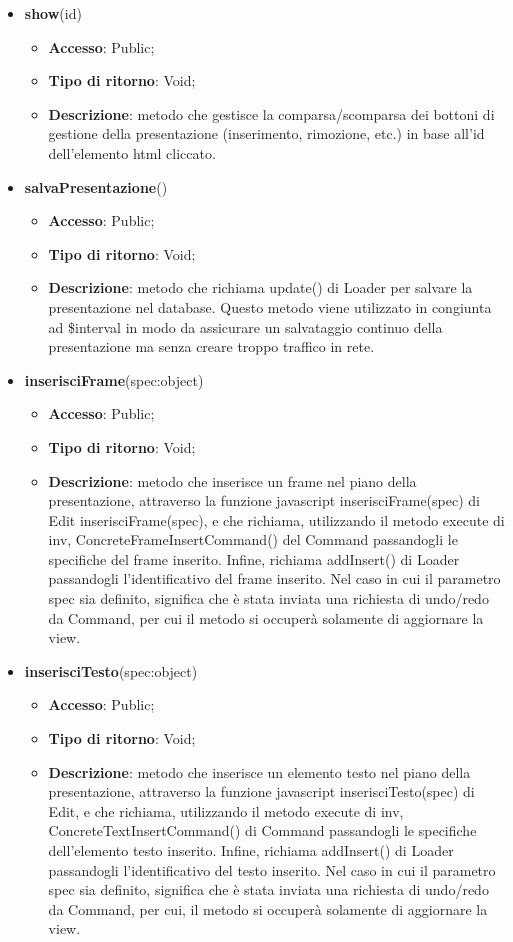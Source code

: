 {{\begin{itemize}
			\item \textbf{show}(id)
			\begin{itemize}
				\item \textbf{Accesso}: Public;
				\item \textbf{Tipo di ritorno}: Void;
				\item \textbf{Descrizione}: metodo che gestisce la comparsa/scomparsa dei bottoni di gestione della presentazione (inserimento, rimozione, etc.) in base all'id dell'elemento html cliccato.
			\end{itemize}
			\item \textbf{salvaPresentazione}()
			\begin{itemize}
				\item \textbf{Accesso}: Public;
				\item \textbf{Tipo di ritorno}: Void;
				\item \textbf{Descrizione}: metodo che richiama update() di Loader per salvare la presentazione nel database. Questo metodo viene utilizzato in congiunta ad \$interval in modo da assicurare un salvataggio continuo della presentazione ma senza creare troppo traffico in rete.
			\end{itemize}
			\item \textbf{inserisciFrame}(spec:object)
			\begin{itemize}
				\item \textbf{Accesso}: Public;
				\item \textbf{Tipo di ritorno}: Void;
				\item \textbf{Descrizione}: metodo che inserisce un frame nel piano della presentazione, attraverso la funzione javascript inserisciFrame(spec) di Edit inserisciFrame(spec), e che richiama, utilizzando il metodo execute di inv, ConcreteFrameInsertCommand() del Command passandogli le specifiche del frame inserito. Infine, richiama addInsert() di Loader passandogli l'identificativo del frame inserito. Nel caso in cui il parametro spec sia definito, significa che è stata inviata una richiesta di undo/redo da Command, per cui il metodo si occuperà solamente di aggiornare la view.
			\end{itemize}
			\item \textbf{inserisciTesto}(spec:object)
			\begin{itemize}
				\item \textbf{Accesso}: Public;
				\item \textbf{Tipo di ritorno}: Void;
				\item \textbf{Descrizione}: metodo che inserisce un elemento testo nel piano della presentazione, attraverso la funzione javascript inserisciTesto(spec) di Edit, e che richiama, utilizzando il metodo execute di inv, ConcreteTextInsertCommand() di Command passandogli le specifiche dell'elemento testo inserito. Infine, richiama addInsert() di Loader passandogli l'identificativo del testo inserito. Nel caso in cui il parametro spec sia definito, significa che è stata inviata una richiesta di undo/redo da Command, per cui, il metodo si occuperà solamente di aggiornare la view.

\end{itemize}
\end{itemize}}}
